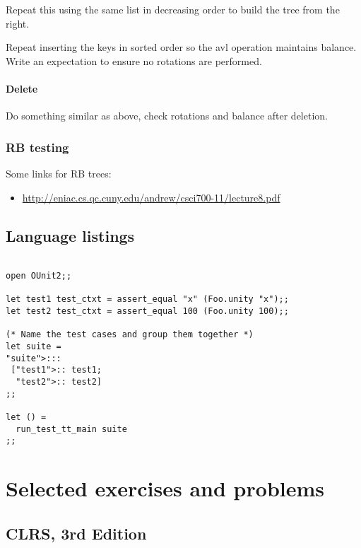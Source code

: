 \documentclass{article}
\begin{document}
Repeat this using the same list in decreasing order to build the tree from the
right.

Repeat inserting the keys in sorted order so the avl operation maintains
balance. Write an expectation to ensure no rotations are performed.



\paragraph{Delete}

Do something similar as above, check
rotations and balance after deletion.


\subsubsection{RB testing}

Some links for RB trees:

\begin{itemize}
\item \href{http://eniac.cs.qc.cuny.edu/andrew/csci700-11/lecture8.pdf}{%
http://eniac.cs.qc.cuny.edu/andrew/csci700-11/lecture8.pdf}
\end{itemize}

\subsection{Language listings}

\begin{lstlisting}[frame=single]  % Start your code-block

open OUnit2;;

let test1 test_ctxt = assert_equal "x" (Foo.unity "x");;
let test2 test_ctxt = assert_equal 100 (Foo.unity 100);;

(* Name the test cases and group them together *)
let suite =
"suite">:::
 ["test1">:: test1;
  "test2">:: test2]
;;

let () =
  run_test_tt_main suite
;;
\end{lstlisting}

\section{Selected exercises and problems}


\subsection{CLRS, 3rd Edition}
\end{document}
